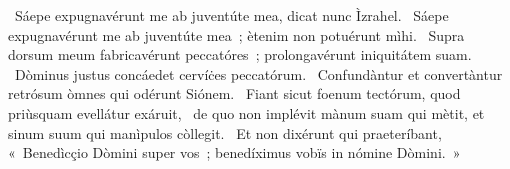 \psalmChapterWithInscription{}
{ }
{%
~Sáepe expugnavérunt me ab juventúte mea, dicat nunc Ìzrahel. 
~Sáepe expugnavérunt me ab juventúte mea~; ètenim non potuérunt mìhi. 
~Supra dorsum meum fabricavérunt peccatóres~; prolongavérunt iniquitátem suam. 
~Dòminus justus concáedet cervíċes peccatórum. 
~Confundàntur et convertàntur retrósum òmnes qui odérunt Siónem. 
~Fiant sicut foenum tectórum, quod priùsquam evellátur exáruit, 
~de quo non implévit mànum suam qui mètit, et sinum suum qui manìpulos còllegit. 
~Et non dixérunt qui praeteríbant, «~Benedìcçio Dòmini super vos~; benedíximus vobïs in nómine Dòmini.~»
}
